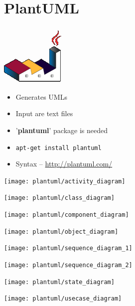 \section{PlantUML}


{
\begin{center}
\includegraphics[scale=0.5]{pic/plantuml_logo}
\end{center}
\begin{itemize}
\item Generates UMLs
\item Input are text files
\item '\textbf{plantuml}' package is needed
\item \texttt{apt-get install plantuml}
\item Syntax -- \url{http://plantuml.com/}
\end{itemize}
}


{
\begin{center}
\texttt{[image: plantuml/activity\_diagram]}
\end{center}
}


{
\begin{center}
\texttt{[image: plantuml/class\_diagram]}
\end{center}
}


{
\begin{center}
\texttt{[image: plantuml/component\_diagram]}
\end{center}
}


{
\begin{center}
\texttt{[image: plantuml/object\_diagram]}
\end{center}
}


{
\begin{center}
\texttt{[image: plantuml/sequence\_diagram\_1]}
\end{center}
}


{
\begin{center}
\texttt{[image: plantuml/sequence\_diagram\_2]}
\end{center}
}


{
\begin{center}
\texttt{[image: plantuml/state\_diagram]}
\end{center}
}


{
\begin{center}
\texttt{[image: plantuml/usecase\_diagram]}
\end{center}
}
